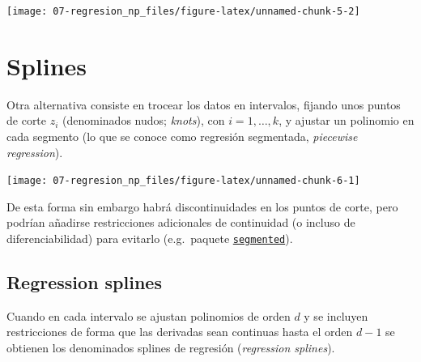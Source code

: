 \documentclass[
]{book}
\newenvironment{Shaded}{\begin{snugshade}}{\end{snugshade}}
\newcommand{\CommentTok}[1]{\textcolor[rgb]{0.56,0.35,0.01}{\textit{#1}}}
\newcommand{\DataTypeTok}[1]{\textcolor[rgb]{0.13,0.29,0.53}{#1}}
\newcommand{\KeywordTok}[1]{\textcolor[rgb]{0.13,0.29,0.53}{\textbf{#1}}}
\newcommand{\NormalTok}[1]{#1}
\newcommand{\OperatorTok}[1]{\textcolor[rgb]{0.81,0.36,0.00}{\textbf{#1}}}
\newcommand{\StringTok}[1]{\textcolor[rgb]{0.31,0.60,0.02}{#1}}
\theoremstyle{break}
\theoremstyle{definition}
\theoremstyle{definition}
\theoremstyle{definition}
\theoremstyle{remark}
\begin{document}
\begin{Shaded}
\end{Shaded}

\begin{center}\texttt{[image: 07-regresion\_np\_files/figure-latex/unnamed-chunk-5-2]} \end{center}

\hypertarget{splines}{%
\section{Splines}\label{splines}}

Otra alternativa consiste en trocear los datos en intervalos, fijando unos puntos de corte \(z_i\) (denominados nudos; \emph{knots}), con \(i = 1, \ldots, k\), y ajustar un polinomio en cada segmento (lo que se conoce como regresión segmentada, \emph{piecewise regression}).

\begin{center}\texttt{[image: 07-regresion\_np\_files/figure-latex/unnamed-chunk-6-1]} \end{center}

De esta forma sin embargo habrá discontinuidades en los puntos de corte, pero podrían añadirse restricciones adicionales de continuidad (o incluso de diferenciabilidad) para evitarlo (e.g.~paquete \href{https://CRAN.R-project.org/package=segmented}{\texttt{segmented}}).

\hypertarget{reg-splines}{%
\subsection{Regression splines}\label{reg-splines}}

Cuando en cada intervalo se ajustan polinomios de orden \(d\) y se incluyen restricciones de forma que las derivadas sean continuas hasta el orden \(d-1\) se obtienen los denominados splines de regresión (\emph{regression splines}).
\end{document}
